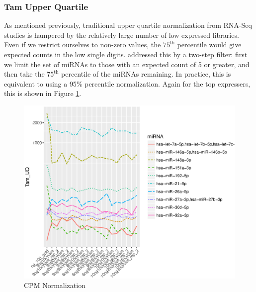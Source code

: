 \documentclass{bioinfo}
\begin{document}
\begin{methods}
\subsubsection{Tam Upper Quartile}
As mentioned previously, traditional upper quartile normalization from RNA-Seq studies is hampered by the relatively large number of low expressed libraries. Even if we restrict ourselves to non-zero values, the $75^{\text{th}}$ percentile would give expected counts in the low single digits.  \citep{Tam15} addressed this by a two-step filter: first we limit the set of miRNAs to those with an expected count of 5 or greater, and then take the $75^{\text{th}}$ percentile of the miRNAs remaining. In practice, this is equivalent to using a 95\% percentile normalization. Again for the top expressers, this is shown in Figure \ref{fig:3}.

\begin{figure}[!tpb]
\centerline{\includegraphics[scale=0.5]{fig-3-tamuq.eps}}
\caption{CPM Normalization}\label{fig:3}
\end{figure} 


\end{methods}
\end{document}
